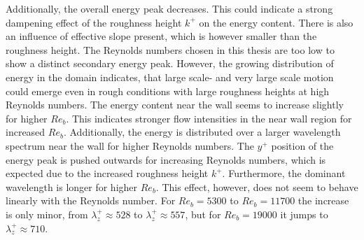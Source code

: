 Additionally, the overall energy peak decreases.
This could indicate a strong dampening effect of the roughness height $k^+$ on the energy content.
There is also an influence of effective slope present, which is however smaller than the roughness height.
The Reynolds numbers chosen in this thesis are too low to show a distinct secondary energy peak.
However, the growing distribution of energy in the domain indicates, that large scale- and very large scale motion could emerge even in rough conditions with large roughness heights at high Reynolds numbers.
The energy content near the wall seems to increase slightly for higher $Re_b$.
This indicates stronger flow intensities in the near wall region for increased $Re_b$.
Additionally, the energy is distributed over a larger wavelength spectrum near the wall for higher Reynolds numbers.
The $y^+$ position of the energy peak is pushed outwards for increasing Reynolds numbers, which is expected due to the increased roughness height $k^+$.
Furthermore, the dominant wavelength is longer for higher $Re_b$.
This effect, however, does not seem to behave linearly with the Reynolds number.
For $Re_b = 5300$ to $Re_b = 11700$ the increase is only minor, from $\lambda_z^+ \approx 528$ to $\lambda_z^+ \approx 557$, but for $Re_b = 19000$ it jumps to $\lambda_z^+ \approx 710$.


